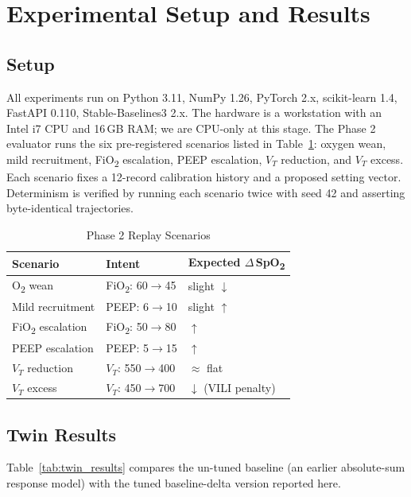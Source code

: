 \documentclass[conference]{IEEEtran}
\begin{document}
\section{Experimental Setup and Results}
\label{sec:experiments}

\subsection{Setup}
All experiments run on Python 3.11, NumPy 1.26, PyTorch 2.x, scikit-learn 1.4, FastAPI 0.110, Stable-Baselines3 2.x. The hardware is a workstation with an Intel i7 CPU and 16\,GB RAM; we are CPU-only at this stage. The Phase 2 evaluator runs the six pre-registered scenarios listed in Table~\ref{tab:scenarios}: oxygen wean, mild recruitment, FiO\textsubscript{2} escalation, PEEP escalation, $V_T$ reduction, and $V_T$ excess. Each scenario fixes a 12-record calibration history and a proposed setting vector. Determinism is verified by running each scenario twice with seed 42 and asserting byte-identical trajectories.

\begin{table}[h]
\centering
\caption{Phase 2 Replay Scenarios}
\label{tab:scenarios}
\renewcommand{\arraystretch}{1.15}
\begin{tabular}{lll}
\toprule
\textbf{Scenario} & \textbf{Intent} & \textbf{Expected $\Delta$\,SpO\textsubscript{2}}\\
\midrule
O\textsubscript{2} wean        & FiO\textsubscript{2}: 60$\rightarrow$45 & slight $\downarrow$\\
Mild recruitment    & PEEP: 6$\rightarrow$10                  & slight $\uparrow$\\
FiO\textsubscript{2} escalation & FiO\textsubscript{2}: 50$\rightarrow$80 & $\uparrow$\\
PEEP escalation     & PEEP: 5$\rightarrow$15                  & $\uparrow$\\
$V_T$ reduction     & $V_T$: 550$\rightarrow$400              & $\approx$ flat\\
$V_T$ excess        & $V_T$: 450$\rightarrow$700              & $\downarrow$ (VILI penalty)\\
\bottomrule
\end{tabular}
\end{table}

\subsection{Twin Results}
Table~\ref{tab:twin_results} compares the un-tuned baseline (an earlier absolute-sum response model) with the tuned baseline-delta version reported here.
\end{document}
